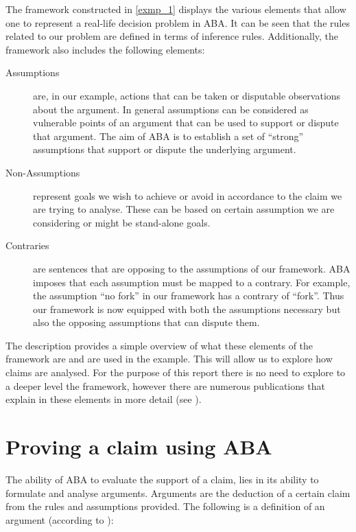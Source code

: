 The framework constructed in \cref{exmp_1} displays the various elements that allow one to represent a real-life decision problem in ABA. It can be seen that the rules related to our problem are defined in terms of inference rules. Additionally, the framework also includes the following elements:

\begin{description}

\item[Assumptions] are, in our example, actions that can be taken or disputable observations about the argument. In general assumptions can be considered as vulnerable points of an argument that can be used to support or dispute that argument. The aim of ABA is to establish a set of ``strong'' assumptions that support or dispute the underlying argument.
\item[Non-Assumptions] represent goals we wish to achieve or avoid in accordance to the claim we are trying to analyse. These can be based on certain assumption we are considering or might be stand-alone goals.
\item[Contraries] are sentences that are opposing to the assumptions of our framework. ABA imposes that each assumption must be mapped to a contrary. For example, the assumption ``no fork'' in our framework has a contrary of ``fork''. Thus our framework is now equipped with both the assumptions necessary but also the opposing assumptions that can dispute them.

\end{description}

The description provides a simple overview of what these elements of the framework are and are used in the example. This will allow us to explore how claims are analysed. For the purpose of this report there is no need to explore to a deeper level the framework, however there are numerous publications that explain in these elements in more detail (see \cite{abatut}).

\section{Proving a claim using ABA}
The ability of ABA to evaluate the support of a claim, lies in its ability to formulate and analyse arguments. Arguments are the deduction of a certain claim from the rules and assumptions provided. The following is a definition of an argument (according to \cite{abatut}):
\newline

